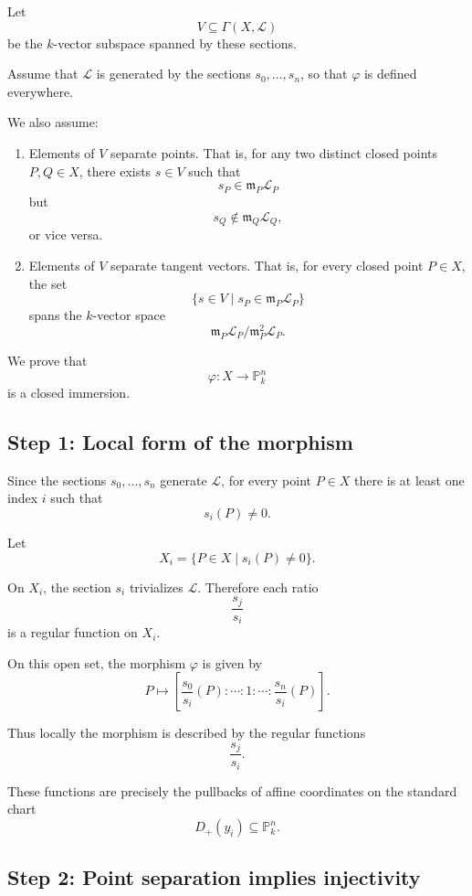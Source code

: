 \documentclass[12pt,a4paper]{article}
\theoremstyle{notespace}
\begin{document}
Let
\[
V\subseteq \Gamma(X,\mathcal L)
\]
be the $k$-vector subspace spanned by these sections.

Assume that $\mathcal L$ is generated by the sections $s_0,\ldots,s_n$,
so that $\varphi$ is defined everywhere.

We also assume:

\begin{enumerate}
	\item Elements of $V$ separate points.
	That is, for any two distinct closed points $P,Q\in X$, there exists
	$s\in V$ such that
	\[
	s_P\in \mathfrak m_P\mathcal L_P
	\]
	but
	\[
	s_Q\notin \mathfrak m_Q\mathcal L_Q,
	\]
	or vice versa.
	
	\item Elements of $V$ separate tangent vectors.
	That is, for every closed point $P\in X$, the set
	\[
	\{s\in V\mid s_P\in \mathfrak m_P\mathcal L_P\}
	\]
	spans the $k$-vector space
	\[
	\mathfrak m_P\mathcal L_P/\mathfrak m_P^2\mathcal L_P.
	\]
\end{enumerate}

We prove that
\[
\varphi:X\to \mathbb P_k^n
\]
is a closed immersion.

\subsection*{Step 1: Local form of the morphism}

Since the sections $s_0,\ldots,s_n$ generate $\mathcal L$, for every point
$P\in X$ there is at least one index $i$ such that
\[
s_i(P)\neq0.
\]

Let
\[
X_i=\{P\in X\mid s_i(P)\neq0\}.
\]

On $X_i$, the section $s_i$ trivializes $\mathcal L$. Therefore each ratio
\[
\frac{s_j}{s_i}
\]
is a regular function on $X_i$.

On this open set, the morphism $\varphi$ is given by
\[
P\longmapsto
\left[
\frac{s_0}{s_i}(P):
\cdots:
1:
\cdots:
\frac{s_n}{s_i}(P)
\right].
\]

Thus locally the morphism is described by the regular functions
\[
\frac{s_j}{s_i}.
\]

These functions are precisely the pullbacks of affine coordinates on the
standard chart
\[
D_+(y_i)\subseteq \mathbb P_k^n.
\]

\subsection*{Step 2: Point separation implies injectivity}
\end{document}
